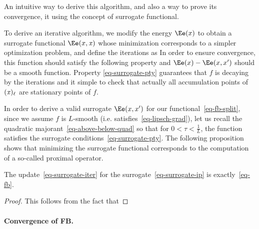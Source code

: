 An intuitive way to derive this algorithm, and also a way to prove its convergence, it using the concept of surrogate functional.

%

To derive an iterative algorithm, we modify the energy $\Ee(x)$ to obtain a surrogate functional $\Ee(x,\it{x})$ whose minimization corresponds to a simpler optimization problem, and define the iterations as
In order to ensure convergence, this function should satisfy the following property
and $\Ee(x)-\Ee(x,x')$ should be a smooth function.
%
Property \eqref{eq-surrogate-pty} guarantees that $f$ is decaying by the iterations
and it simple to check that actually all accumulation points of $(\it{x})_\ell$ are stationary points of $f$. 

In order to derive a valid surrogate $\Ee(x,x')$ for our functional~\eqref{eq-fb-split}, since we assume $f$ is $L$-smooth (i.e. satisfies~\eqref{eq-lipsch-grad}), let us recall the quadratic majorant~\eqref{eq-above-below-quad}
so that for $0 < \tau < \frac{1}{L}$, the function 
satisfies the surrogate conditions~\eqref{eq-surrogate-pty}.
%
The following proposition shows that minimizing the surrogate functional corresponds to the computation of a so-called proximal operator. 

\begin{prop}
	The update~\eqref{eq-surrogate-iter} for the surrogate~\eqref{eq-surrogate-ip} is exactly~\eqref{eq-fb}.
\end{prop}
\begin{proof}
	This follows from the fact that
\end{proof}

\paragraph{Convergence of FB. }

